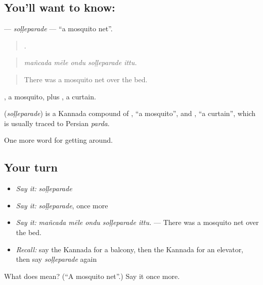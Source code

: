 \subsection*{You'll want to know: }
\textbf{} — \emph{soḷḷeparade} — \textquotedblleft{}a mosquito net\textquotedblright{}.

\begin{quote}
    .
\end{quote}

\begin{quote}
\emph{mañcada mēle ondu soḷḷeparade ittu.}
\end{quote}

\begin{quote}
There was a mosquito net over the bed.
\end{quote}

, a mosquito, plus , a curtain.

\begin{cousinweb}
\textbf{} (\emph{soḷḷeparade}) is a Kannada compound of , \textquotedblleft{}a mosquito\textquotedblright{}, and , \textquotedblleft{}a curtain\textquotedblright{}, which is usually traced to Persian \emph{parda}.
\end{cousinweb}

\begin{grammarlens}[title={What you've built}]
One more word for getting around.
\end{grammarlens}

\subsection*{Your turn}
\begin{itemize}
\raggedright
  \item \emph{Say it:} \emph{soḷḷeparade}
  \item \emph{Say it:} \emph{soḷḷeparade}, once more
  \item \emph{Say it:} \emph{mañcada mēle ondu soḷḷeparade ittu.} — There was a mosquito net over the bed.
  \item \emph{Recall:} say the Kannada for a balcony, then the Kannada for an elevator, then say \emph{soḷḷeparade} again
\end{itemize}

\begin{tcolorbox}[breakable,colback=teal!4,colframe=teal!35!black,title={Before you move on}]
What does  mean? (\textquotedblleft{}A mosquito net\textquotedblright{}.) Say it once more.
\end{tcolorbox}
